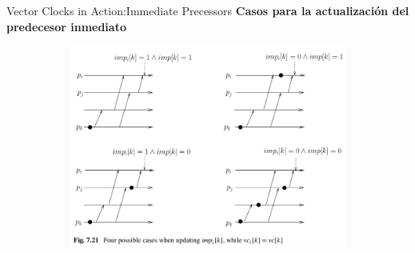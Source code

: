 \begin{frame}[fragile]{Vector Clocks in Action:}{Immediate Precessors}
    \justifying
    \textbf{Casos para la actualización del predecesor inmediato}
    \begin{figure}
        \centering
        \begin{subfigure}[b]{\textwidth}
            \includegraphics[scale=0.5]{Imagenes/casosActualizarIPT.png}
            \label{fig:ejemplo1}
        \end{subfigure}
    \end{figure}
\end{frame}
